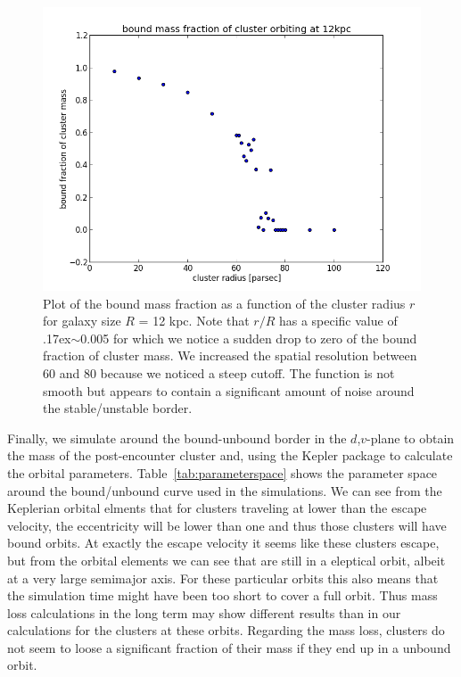\documentclass{aa}
\newcommand{\mytilde}{\raise.17ex\hbox{$\scriptstyle\mathtt{\sim}$}}
\begin{document}
  \begin{figure}
   \centering
   \includegraphics[width=\hsize]{img/bound_mass_at_12000_pc.png}
      \caption{Plot of the bound mass fraction as a function of the cluster radius $r$ for galaxy size $R$ =  12 kpc.
      		   Note that $r/R$ has a specific value of \mytilde 0.005 for which we notice a sudden drop to zero of the bound fraction of cluster mass.
		   We increased the spatial resolution between 60 and 80 because we noticed a steep cutoff. The function is not smooth but appears to 
		   contain a significant amount of noise around the stable/unstable border. 
              }
         \label{fig:bound_mass_extra_res}
   \end{figure}

Finally, we simulate around the bound-unbound border in the $d$,$v$-plane to obtain the mass of the post-encounter cluster and, using the Kepler package to calculate the orbital parameters. Table~\ref{tab:parameterspace} shows the parameter space around the bound/unbound curve used in the simulations. We can see from the Keplerian orbital elments that for clusters traveling at lower than the escape velocity, the eccentricity will be lower than one and thus those clusters will have bound orbits. At exactly the escape velocity it seems like these clusters escape, but from the orbital elements we can see that are still in a eleptical orbit, albeit at a very large semimajor axis. For these particular orbits this also means that the simulation time might have been too short to cover a full orbit. Thus mass loss calculations in the long term may show different results than in our calculations for the clusters at these orbits. Regarding the mass loss, clusters do not seem to loose a significant fraction of their mass if they end up in a unbound orbit.
\end{document}
